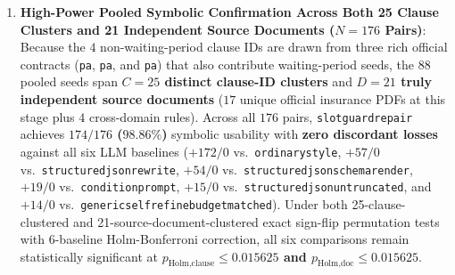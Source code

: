 \documentclass[10pt,twocolumn]{article}
\renewcommand{\_}{\textunderscore\allowbreak}
\begin{document}
\begin{enumerate}[leftmargin=*,nosep]
  \item \textbf{High-Power Pooled Symbolic Confirmation Across Both 25 Clause Clusters and 21 Independent Source Documents ($N=176$ Pairs)}: Because the $4$ non-waiting-period clause IDs are drawn from three rich official contracts (\texttt{pa\_2651}, \texttt{pa\_2650}, and \texttt{pa\_1073}) that also contribute waiting-period seeds, the $88$ pooled seeds span \textbf{$C=25$ distinct clause-ID clusters} and \textbf{$D=21$ truly independent source documents} ($17$ unique official insurance PDFs at this stage plus $4$ cross-domain rules). Across all $176$ pairs, \texttt{slot\_guard\_repair} achieves \textbf{$174/176$ ($98.86\%$)} symbolic usability with \textbf{zero discordant losses} against all six LLM baselines ($+172/0$ vs.\ \texttt{ordinary\_style}, $+57/0$ vs.\ \texttt{structured\_json\_rewrite}, $+54/0$ vs.\ \texttt{structured\_json\_schema\_render}, $+19/0$ vs.\ \texttt{condition\_prompt}, $+15/0$ vs.\ \texttt{structured\_json\_untruncated\_320}, and $+14/0$ vs.\ \texttt{generic\_self\_refine\_budget\_matched}). Under both 25-clause-clustered and 21-source-document-clustered exact sign-flip permutation tests with 6-baseline Holm-Bonferroni correction, all six comparisons remain statistically significant at \textbf{$p_{\text{Holm,clause}} \le 0.015625$ and $p_{\text{Holm,doc}} \le 0.015625$}.

\end{enumerate}
\end{document}
